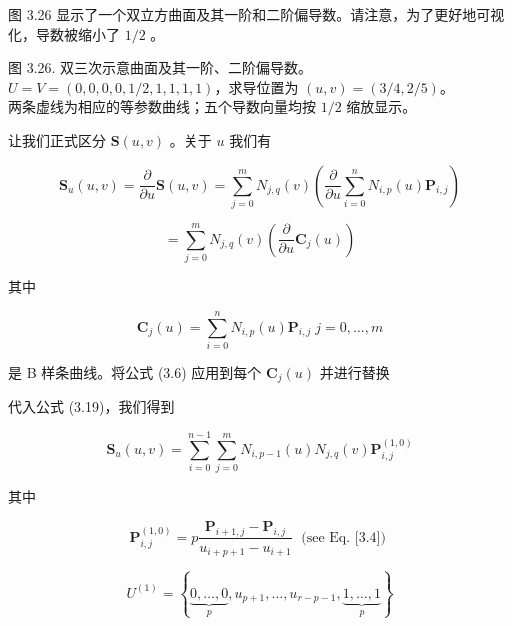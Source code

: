 \documentclass[../main.tex]{subfiles}
\begin{document}
图 3.26 显示了一个双立方曲面及其一阶和二阶偏导数。请注意，为了更好地可视化，导数被缩小了 \(1/2\) 。

\begin{center}
\begin{minipage}{18cm}
\vspace*{.6\baselineskip}
\centering
{}
\par\smallskip
图 3.26. 双三次示意曲面及其一阶、二阶偏导数。\\ \(U=V=(0,0,0,0,1/2,1,1,1,1)\)，求导位置为 \((u,v)=(3/4,2/5)\)。\\ 两条虚线为相应的等参数曲线；五个导数向量均按 \(1/2\) 缩放显示。
\end{minipage}
\end{center}

让我们正式区分 \(\mathbf{S}\left( {u,v}\right)\) 。关于 \(u\) 我们有

\[
{\mathbf{S}}_{u}\left( {u,v}\right)  = \frac{\partial }{\partial u}\mathbf{S}\left( {u,v}\right)  = \mathop{\sum }\limits_{{j = 0}}^{m}{N}_{j,q}\left( v\right) \left( {\frac{\partial }{\partial u}\mathop{\sum }\limits_{{i = 0}}^{n}{N}_{i,p}\left( u\right) {\mathbf{P}}_{i,j}}\right)  \tag{3.19}
\]

\[
= \mathop{\sum }\limits_{{j = 0}}^{m}{N}_{j,q}\left( v\right) \left( {\frac{\partial }{\partial u}{\mathbf{C}}_{j}\left( u\right) }\right)
\]

其中

\[
{\mathbf{C}}_{j}\left( u\right)  = \mathop{\sum }\limits_{{i = 0}}^{n}{N}_{i,p}\left( u\right) {\mathbf{P}}_{i,j}\;j = 0,\ldots ,m
\]



是 B 样条曲线。将公式 (3.6) 应用到每个 \({\mathbf{C}}_{j}\left( u\right)\) 并进行替换

代入公式 (3.19)，我们得到

\[
{\mathbf{S}}_{u}\left( {u,v}\right)  = \mathop{\sum }\limits_{{i = 0}}^{{n - 1}}\mathop{\sum }\limits_{{j = 0}}^{m}{N}_{i,p - 1}\left( u\right) {N}_{j,q}\left( v\right) {\mathbf{P}}_{i,j}^{\left( 1,0\right) } \tag{3.20}
\]

其中

\[
{\mathbf{P}}_{i,j}^{\left( 1,0\right) } = p\frac{{\mathbf{P}}_{i + 1,j} - {\mathbf{P}}_{i,j}}{{u}_{i + p + 1} - {u}_{i + 1}}\;\text{ (see Eq. [3.4]) }
\]

\[
{U}^{\left( 1\right) } = \left\{  {\underset{p}{\underbrace{0,\ldots ,0}},{u}_{p + 1},\ldots ,{u}_{r - p - 1},\underset{p}{\underbrace{1,\ldots ,1}}}\right\}
\]
\end{document}
